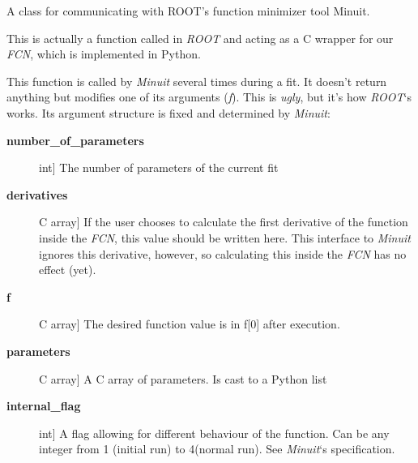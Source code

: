 \documentclass[a4paper,10pt,english]{sphinxmanual}
\begin{document}
\begin{fulllineitems}
\label{index:kafe.minuit.Minuit}
A class for communicating with ROOT's function minimizer tool Minuit.

\begin{fulllineitems}
\label{index:kafe.minuit.Minuit.FCN_wrapper}
This is actually a function called in \emph{ROOT} and acting as a C wrapper
for our \emph{FCN}, which is implemented in Python.

This function is called by \emph{Minuit} several times during a fit. It
doesn't return anything but modifies one of its arguments (\emph{f}).
This is \emph{ugly}, but it's how \emph{ROOT}`s  works. Its argument
structure is fixed and determined by \emph{Minuit}:
\begin{description}
\item[{\textbf{number\_of\_parameters}}] \leavevmode{[}int{]}
The number of parameters of the current fit

\item[{\textbf{derivatives}}] \leavevmode{[}C array{]}
If the user chooses to calculate the first derivative of the
function inside the \emph{FCN}, this value should be written here. This
interface to \emph{Minuit} ignores this derivative, however, so
calculating this inside the \emph{FCN} has no effect (yet).

\item[{\textbf{f}}] \leavevmode{[}C array{]}
The desired function value is in f{[}0{]} after execution.

\item[{\textbf{parameters}}] \leavevmode{[}C array{]}
A C array of parameters. Is cast to a Python list

\item[{\textbf{internal\_flag}}] \leavevmode{[}int{]}
A flag allowing for different behaviour of the function.
Can be any integer from 1 (initial run) to 4(normal run). See
\emph{Minuit}`s specification.

\end{description}


\end{fulllineitems}
\end{fulllineitems}
\end{document}
